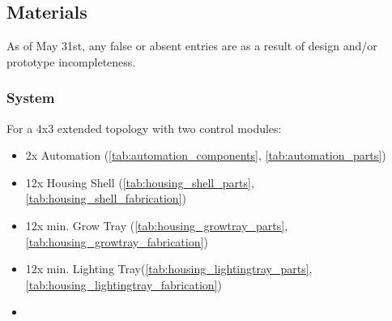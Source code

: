 \subsection{Materials}

As of May 31st, any false or absent entries are as a result of design and/or prototype incompleteness.

\subsubsection{System}

For a 4x3 extended topology with two control modules:
\begin{itemize}
    \item 2x Automation (\ref{tab:automation_components}, \ref{tab:automation_parts})
    \item 12x Housing Shell (\ref{tab:housing_shell_parts}, \ref{tab:housing_shell_fabrication})
    \item 12x min. Grow Tray (\ref{tab:housing_growtray_parts}, \ref{tab:housing_growtray_fabrication})
    \item 12x min. Lighting Tray(\ref{tab:housing_lightingtray_parts}, \ref{tab:housing_lightingtray_fabrication})
    \item 
\end{itemize}

\clearpage

